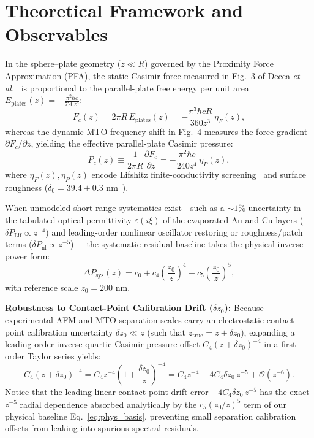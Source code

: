 \documentclass[10pt,twocolumn,a4paper]{article}
\begin{document}
\section{Theoretical Framework and Observables}
In the sphere--plate geometry ($z \ll R$) governed by the Proximity Force Approximation (PFA), the static Casimir force measured in Fig.~3 of Decca \textit{et al.}~\cite{decca2003} is proportional to the parallel-plate free energy per unit area $E_{\mathrm{plates}}(z) = -\frac{\pi^2 \hbar c}{720 z^3}$:
\begin{equation}
F_c(z) = 2\pi R\, E_{\mathrm{plates}}(z) = -\frac{\pi^3 \hbar c R}{360 z^3}\,\eta_F(z),
\label{eq:force_pfa}
\end{equation}
whereas the dynamic MTO frequency shift in Fig.~4 measures the force gradient $\partial F_c/\partial z$, yielding the effective parallel-plate Casimir pressure:
\begin{equation}
P_c(z) \equiv \frac{1}{2\pi R}\frac{\partial F_c}{\partial z} = -\frac{\pi^2 \hbar c}{240 z^4}\,\eta_P(z),
\label{eq:pressure_pfa}
\end{equation}
where $\eta_F(z), \eta_P(z)$ encode Lifshitz finite-conductivity screening~\cite{lifshitz1956} and surface roughness ($\delta_0 = 39.4 \pm 0.3\text{ nm}$~\cite{decca2003}).

When unmodeled short-range systematics exist---such as a $\sim 1\%$ uncertainty in the tabulated optical permittivity $\varepsilon(i\xi)$ of the evaporated Au and Cu layers ($\delta P_{\mathrm{Lif}} \propto z^{-4}$) and leading-order nonlinear oscillator restoring or roughness/patch terms ($\delta P_{\mathrm{nl}} \propto z^{-5}$)~\cite{decca2003}---the systematic residual baseline takes the physical inverse-power form:
\begin{equation}
\Delta P_{\mathrm{sys}}(z) = c_0 + c_4 \left(\frac{z_0}{z}\right)^4 + c_5 \left(\frac{z_0}{z}\right)^5,
\label{eq:phys_basis}
\end{equation}
with reference scale $z_0 = 200\text{ nm}$.

\textbf{Robustness to Contact-Point Calibration Drift ($\delta z_0$):} Because experimental AFM and MTO separation scales carry an electrostatic contact-point calibration uncertainty $\delta z_0 \ll z$ (such that $z_{\mathrm{true}} = z + \delta z_0$), expanding a leading-order inverse-quartic Casimir pressure offset $C_4 (z + \delta z_0)^{-4}$ in a first-order Taylor series yields:
\begin{equation}
C_4 (z + \delta z_0)^{-4} = C_4 z^{-4}\left(1 + \frac{\delta z_0}{z}\right)^{-4} = C_4 z^{-4} - 4 C_4 \delta z_0\, z^{-5} + \mathcal{O}\!\left(z^{-6}\right).
\label{eq:taylor_drift}
\end{equation}
Notice that the leading linear contact-point drift error $-4 C_4 \delta z_0\, z^{-5}$ has the exact $z^{-5}$ radial dependence absorbed analytically by the $c_5 (z_0/z)^5$ term of our physical baseline Eq.~\eqref{eq:phys_basis}, preventing small separation calibration offsets from leaking into spurious spectral residuals.
\end{document}
